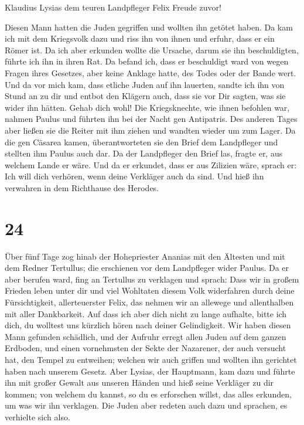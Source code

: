  Klaudius Lysias dem teuren Landpfleger Felix Freude
zuvor!

 Diesen Mann hatten die Juden gegriffen und wollten ihn
getötet haben. Da kam ich mit dem Kriegsvolk dazu und riss ihn von ihnen
und erfuhr, dass er ein Römer ist.  Da ich aber erkunden
wollte die Ursache, darum sie ihn beschuldigten, führte ich ihn in ihren
Rat.  Da befand ich, dass er beschuldigt ward von wegen
Fragen ihres Gesetzes, aber keine Anklage hatte, des Todes oder der
Bande wert.  Und da vor mich kam, dass etliche Juden auf
ihn lauerten, sandte ich ihn von Stund an zu dir und entbot den Klägern
auch, dass sie vor Dir sagten, was sie wider ihn hätten. Gehab dich
wohl!  Die Kriegsknechte, wie ihnen befohlen war, nahmen
Paulus und führten ihn bei der Nacht gen Antipatris.  Des
anderen Tages aber ließen sie die Reiter mit ihm ziehen und wandten
wieder um zum Lager.  Da die gen Cäsarea kamen,
überantworteten sie den Brief dem Landpfleger und stellten ihm Paulus
auch dar.  Da der Landpfleger den Brief las, fragte er,
aus welchem Lande er wäre. Und da er erkundet, dass er aus Zilizien
wäre, sprach er:  Ich will dich verhören, wenn deine
Verkläger auch da sind. Und hieß ihn verwahren in dem Richthause des
Herodes.

\hypertarget{section-23}{%
\section{24}\label{section-23}}

 Über fünf Tage zog hinab der Hohepriester Ananias mit den
Ältesten und mit dem Redner Tertullus; die erschienen vor dem
Landpfleger wider Paulus.  Da er aber berufen ward, fing
an Tertullus zu verklagen und sprach:  Dass wir in großem
Frieden leben unter dir und viel Wohltaten diesem Volk widerfahren durch
deine Fürsichtigkeit, allerteuerster Felix, das nehmen wir an allewege
und allenthalben mit aller Dankbarkeit.  Auf dass ich aber
dich nicht zu lange aufhalte, bitte ich dich, du wolltest uns kürzlich
hören nach deiner Gelindigkeit.  Wir haben diesen Mann
gefunden schädlich, und der Aufruhr erregt allen Juden auf dem ganzen
Erdboden, und einen vornehmsten der Sekte der Nazarener, 
der auch versucht hat, den Tempel zu entweihen; welchen wir auch griffen
und wollten ihn gerichtet haben nach unserem Gesetz.  Aber
Lysias, der Hauptmann, kam dazu und führte ihn mit großer Gewalt aus
unseren Händen  und hieß seine Verkläger zu dir kommen;
von welchem du kannst, so du es erforschen willst, das alles erkunden,
um was wir ihn verklagen.  Die Juden aber redeten auch
dazu und sprachen, es verhielte sich also.

